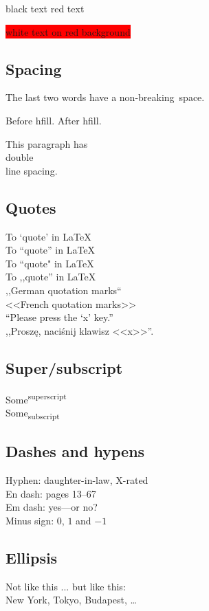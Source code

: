 \documentclass{article}
\begin{document}
  {black text \color{red}red text}

  \colorbox{red}{\color{white}white text on red background}

  \subsection{Spacing}

  The last two words have a non-breaking~space.

  Before hfill. \hfill After hfill.

  \begin{doublespace}
    This paragraph has \\ double \\ line spacing.
  \end{doublespace}

  \subsection{Quotes}

  To `quote' in LaTeX \\
  To ``quote'' in LaTeX \\
  To ``quote" in LaTeX \\
  To ,,quote'' in LaTeX \\
  ,,German quotation marks`` \\
  <<French quotation marks>> \\
  ``Please press the `x' key.'' \\
  ,,Proszę, naciśnij klawisz <<x>>''.

  \subsection{Super/subscript}

  Some\textsuperscript{superscript} \\
  Some\textsubscript{subscript}

  \subsection{Dashes and hypens}

  Hyphen: daughter-in-law, X-rated\\
  En dash: pages 13--67\\
  Em dash: yes---or no? \\
  Minus sign: $0$, $1$ and $-1$

  \subsection{Ellipsis}

  Not like this ... but like this:\\
  New York, Tokyo, Budapest, \ldots
\end{document}
